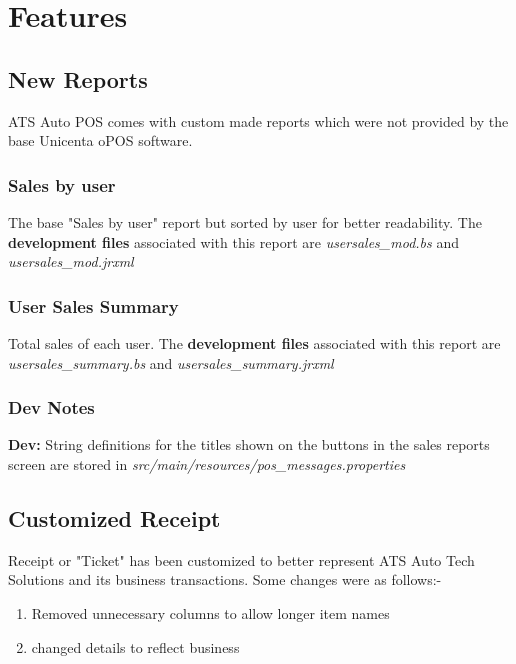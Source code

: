 \section{Features}

\subsection{New Reports}

ATS Auto POS comes with custom made reports which were not provided by the base Unicenta oPOS software.

\subsubsection{Sales by user}

The base "Sales by user" report but sorted by user for better readability. The \textbf{development files} associated with this report are \textit{usersales\_mod.bs} and \textit{usersales\_mod.jrxml}

\subsubsection{User Sales Summary}

Total sales of each user. The \textbf{development files} associated with this report are \textit{usersales\_summary.bs} and \textit{usersales\_summary.jrxml}

\subsubsection{Dev Notes}

\textbf{Dev: } String definitions for the titles shown on the buttons in the sales reports screen are stored in \textit{src/main/resources/pos\_messages.properties}

\subsection{Customized Receipt}

Receipt or "Ticket" has been customized to better represent ATS Auto Tech Solutions and its business transactions. Some changes were as follows:-

\begin{enumerate}
	\item Removed unnecessary columns to allow longer item names
	
	\item changed details to reflect business
\end{enumerate}

